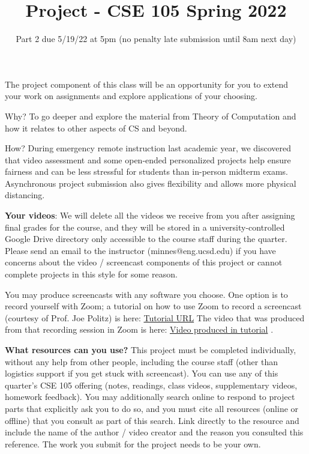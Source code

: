 

\title{Project - CSE 105 Spring 2022}
\date{Part 2 due 5/19/22 at 5pm (no penalty late submission until 8am next day)}


\maketitle
\thispagestyle{fancy}

\vspace{-30pt}

 The project component of this class will be an opportunity for you to extend your work on 
 assignments and explore applications of your choosing. 
 
 Why?  To go deeper and explore the material from Theory of Computation and how it relates to 
 other aspects of CS and beyond. 
 
 How?  During emergency remote instruction last academic year, we discovered that video 
 assessment and some open-ended personalized projects help ensure fairness and can be less 
 stressful for students than in-person midterm exams. Asynchronous project submission also 
 gives flexibility and allows more physical distancing. 
 
 {\bf Your videos}: We will delete all the videos we receive from you after assigning final grades for 
 the course, and they will be stored in a university-controlled Google Drive directory only 
 accessible to the course staff during the quarter. Please send an email to the instructor 
 (minnes@eng.ucsd.edu) if you have concerns about the video / screencast components of this 
 project or cannot complete projects in this style for some reason. 
 
 You may produce screencasts with any software you choose. One option is to record yourself 
 with Zoom; a tutorial on how to use Zoom to record a screencast (courtesy of Prof. Joe Politz) is 
 here: \href{https://drive.google.com/open?id=1KROMAQuTCk40zwrEFotlYSJJQdcG_GUU}{Tutorial URL}
 The video that was produced from that recording session in Zoom is here:
 \href{{https://drive.google.com/open?id=1MxJN6CQcXqIbOekDYMxjh7mTt1TyRVMl}}{Video produced in tutorial} .
 
 {\bf What resources can you use? }
 This project must be completed individually, without any help from other people, 
 including the course staff (other than logistics support if you get stuck with screencast). 
 You can use any of this quarter’s CSE 105 offering (notes, readings, class videos, 
 supplementary videos, homework feedback). You may additionally search online to respond to 
 project parts that explicitly ask you to do so, and you must  cite all resources (online or offline) 
 that you consult as part of this search. Link directly to the resource and include the name of the 
 author / video creator and the reason you consulted this reference. The work you submit for the 
 project needs to be your own. 
 
